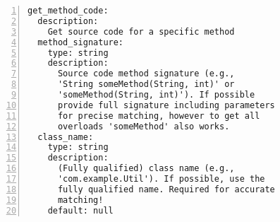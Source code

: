 \begin{figure}[t]
\begin{lstlisting}[style=yaml,caption={MCP tool schema for the \texttt{get\_method\_code} tool from CodeContextMCP server. Tools are exposed to ReAct agents based on tag-based access control.},label={fig:mcp-tool-schema},numbers=left,numberstyle=\tiny\color{gray},frame=single]
get_method_code:
  description:
    Get source code for a specific method
  method_signature:
    type: string
    description:
      Source code method signature (e.g.,
      'String someMethod(String, int)' or
      'someMethod(String, int)'). If possible 
      provide full signature including parameters 
      for precise matching, however to get all 
      overloads 'someMethod' also works.
  class_name:
    type: string
    description:
      (Fully qualified) class name (e.g.,
      'com.example.Util'). If possible, use the
      fully qualified name. Required for accurate
      matching!
    default: null
\end{lstlisting}
\end{figure}
